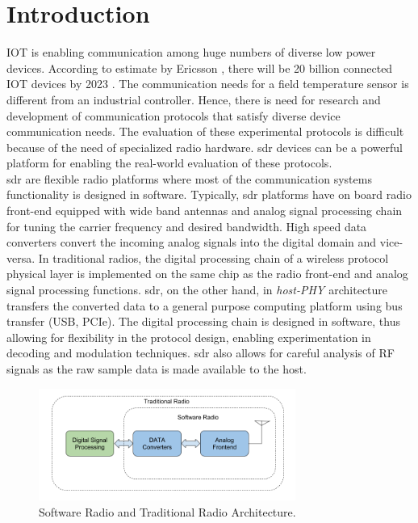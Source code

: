 \chapter{Introduction}
\ac{IOT} is enabling communication among huge numbers of diverse low power devices.  
According to estimate by Ericsson \cite{noauthor_internet_2017}, there will be 20 billion connected \ac{IOT} devices by 2023 . 
The communication needs for a field temperature sensor is different from an industrial controller. 
Hence, there is need for research and development of communication protocols that satisfy diverse device communication needs. 
The evaluation of these experimental protocols is difficult because of the need of specialized radio hardware. 
\ac{sdr} devices can be a powerful platform for enabling the real-world evaluation of these protocols.\\

\ac{sdr} are flexible radio platforms where most of the communication systems functionality is designed in software. Typically, \ac{sdr} platforms have on board radio front-end equipped with wide band antennas and analog signal processing chain for tuning the carrier frequency and desired bandwidth. High speed data converters convert the incoming analog signals into the digital domain and vice-versa. In traditional radios, the digital processing chain of a wireless protocol physical layer is implemented on the same chip as the radio front-end and analog signal processing functions. \ac{sdr}, on the other hand, in \textit{host-PHY \cite{nychis_enabling_nodate}} architecture transfers the converted data to a general purpose computing platform using bus transfer (USB, PCIe).  The digital processing chain is designed in software, thus allowing for flexibility in the protocol design, enabling experimentation in decoding and modulation techniques. \ac{sdr} also allows for careful analysis of RF signals as the raw sample data is made available to the host.\\

\begin{figure}[!h]
\centering
\includegraphics[width=0.75\textwidth]{Figure/SDRSystem.png}
\caption{Software Radio and Traditional Radio Architecture.}
\label{sdr_architecture}
\end{figure}


